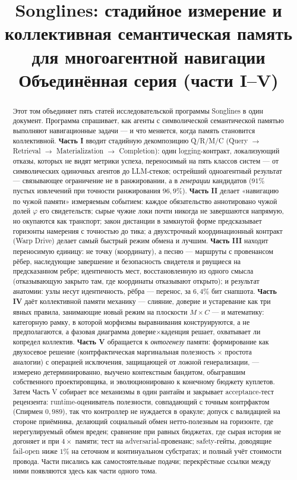 \documentclass{article}
\title{Songlines: стадийное измерение и коллективная семантическая
память для многоагентной навигации\\
\large Объединённая серия (части I--V)}
\begin{document}
\maketitle
\begin{abstract}
Этот том объединяет пять статей исследовательской программы
Songlines в один документ. Программа спрашивает, как агенты с
символической семантической памятью выполняют навигационные задачи
--- и что меняется, когда память становится коллективной.
\textbf{Часть I} вводит стадийную декомпозицию Q/R/M/C (Query $\to$
Retrieval $\to$ Materialization $\to$ Completion): один
logging-контракт, локализующий отказы, которых не видят метрики
успеха, переносимый на пять классов систем --- от символических
одиночных агентов до LLM-стеков; острейший одноагентный результат ---
связывающее ограничение не в ранжировании, а в \emph{генерации}
кандидатов ($91\%$ пустых извлечений при точности ранжирования
$96{,}9\%$). \textbf{Часть II} делает «навигацию по чужой памяти»
измеряемым событием: каждое обязательство аннотировано чужой долей
$\varphi$ его свидетельств; сырые чужие локи почти никогда не
завершаются напрямую, но окупаются как транспорт; закон дистанции в
замкнутой форме предсказывает горизонты намерения с точностью до
тика; а двухстрочный координационный контракт (Warp Drive) делает
самый быстрый режим обмена и лучшим. \textbf{Часть III} находит
переносимую единицу: не точку (координату), а песню --- маршруты с
провенансом рёбер, наследующие завершение и безопасность свидетеля и
рвущиеся на предсказанном ребре; идентичность мест, восстановленную
из одного смысла (отказывающую закрыто там, где координаты отказывают
открыто); и результат анатомии: узлы несут идентичность, рёбра ---
перенос, за $6{,}4\%$ бит снапшота. \textbf{Часть IV} даёт
коллективной памяти механику --- слияние, доверие и устаревание как
три явных правила, занимающие новый режим на плоскости $M{\times}C$
--- и математику: категорную рамку, в которой морфизмы выравнивания
конструируются, а не предполагаются, а фазовая диаграмма
доверие$\times$каденция решает, охватывает ли копредел коллектив.
\textbf{Часть V} обращается к \emph{онтогенезу} памяти: формирование
как двухосевое решение (контрфактическая маргинальная полезность
$\times$ простота аналогии) с операцией исключения, защищающей от
ложной генерализации, --- измерено детерминированно, выучено
контекстным бандитом, обыгравшим собственного проектировщика, и
эволюционировано к конечному бюджету куплетов. Затем Часть V собирает
все механизмы в один рантайм и закрывает acceptance-тест рецензента:
runtime-оцениватель полезности, совпадающий с точным контрфактом
(Спирмен $0{,}989$), так что контроллер не нуждается в оракуле;
допуск с валидацией на стороне приёмника, делающий социальный обмен
нетто-полезным на горизонте, где нерегулируемый обмен вреден;
сравнение при равных бюджетах, где сырая история не догоняет и при
$4\times$ памяти; тест на adversarial-провенанс; safety-гейты,
доводящие fail-open ниже $1\%$ на сеточном и континуальном
субстратах; и полный учёт стоимости провода. Части писались как
самостоятельные подачи; перекрёстные ссылки между ними появляются
здесь как части одного тома.
\end{abstract}
\end{document}
